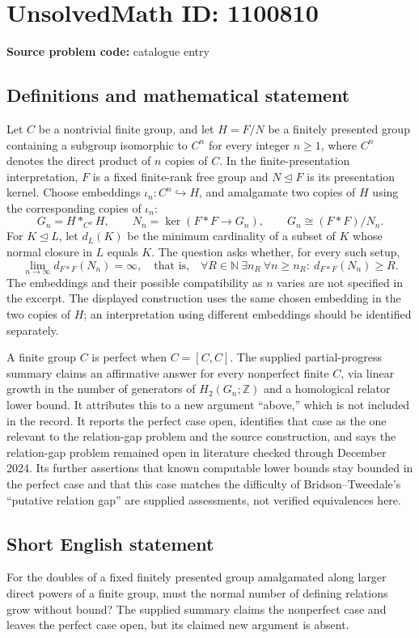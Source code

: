 \documentclass[11pt]{article}
\newcommand{\N}{\mathbb{N}}
\newcommand{\Z}{\mathbb{Z}}
\begin{document}
\section*{UnsolvedMath ID: 1100810}
\textbf{Source problem code:} catalogue entry
\subsection{Definitions and mathematical statement}
Let \(C\) be a nontrivial finite group, and let \(H=F/N\) be a finitely presented group containing a subgroup isomorphic to \(C^n\) for every integer \(n\ge1\), where \(C^n\) denotes the direct product of \(n\) copies of \(C\). In the finite-presentation interpretation, \(F\) is a fixed finite-rank free group and \(N\trianglelefteq F\) is its presentation kernel. Choose embeddings \(\iota_n:C^n\hookrightarrow H\), and amalgamate two copies of \(H\) using the corresponding copies of \(\iota_n\):
\[
G_n=H*_{C^n}H,\qquad
N_n=\ker(F*F\longrightarrow G_n),\qquad
G_n\cong(F*F)/N_n.
\]
For \(K\trianglelefteq L\), let \(d_L(K)\) be the minimum cardinality of a subset of \(K\) whose normal closure in \(L\) equals \(K\). The question asks whether, for every such setup,
\[
\lim_{n\to\infty}d_{F*F}(N_n)=\infty,
\quad\text{that is,}\quad
\forall R\in\N\ \exists n_R\ \forall n\ge n_R:\ d_{F*F}(N_n)\ge R.
\]
The embeddings and their possible compatibility as \(n\) varies are not specified in the excerpt. The displayed construction uses the same chosen embedding in the two copies of \(H\); an interpretation using different embeddings should be identified separately.

A finite group \(C\) is perfect when \(C=[C,C]\). The supplied partial-progress summary claims an affirmative answer for every nonperfect finite \(C\), via linear growth in the number of generators of \(H_2(G_n;\Z)\) and a homological relator lower bound. It attributes this to a new argument ``above,'' which is not included in the record. It reports the perfect case open, identifies that case as the one relevant to the relation-gap problem and the source construction, and says the relation-gap problem remained open in literature checked through December 2024. Its further assertions that known computable lower bounds stay bounded in the perfect case and that this case matches the difficulty of Bridson--Tweedale's ``putative relation gap'' are supplied assessments, not verified equivalences here.
\subsection{Short English statement}
For the doubles of a fixed finitely presented group amalgamated along larger direct powers of a finite group, must the normal number of defining relations grow without bound? The supplied summary claims the nonperfect case and leaves the perfect case open, but its claimed new argument is absent.
\end{document}

